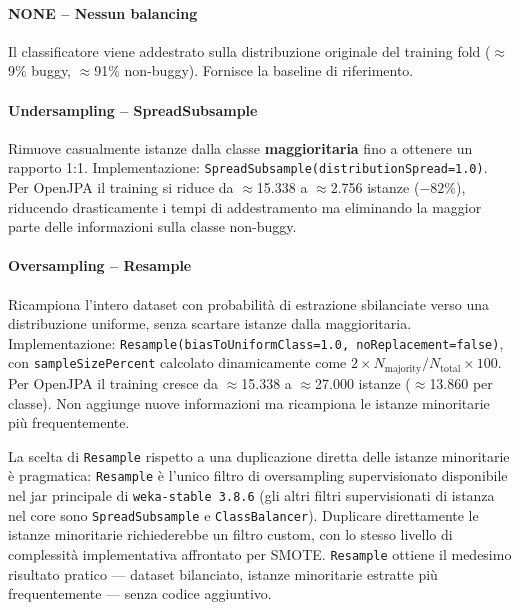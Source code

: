 \paragraph{NONE -- Nessun balancing}

Il classificatore viene addestrato sulla distribuzione originale del training fold
($\approx$9\% buggy, $\approx$91\% non-buggy). Fornisce la baseline di riferimento.

\paragraph{Undersampling -- SpreadSubsample}

Rimuove casualmente istanze dalla classe \textbf{maggioritaria} fino a ottenere un
rapporto 1:1. Implementazione: \texttt{SpreadSubsample(distributionSpread=1.0)}.
Per OpenJPA il training si riduce da $\approx$15.338 a $\approx$2.756 istanze ($-82\%$),
riducendo drasticamente i tempi di addestramento ma eliminando la maggior parte delle
informazioni sulla classe non-buggy.

\paragraph{Oversampling -- Resample}

Ricampiona l'intero dataset con probabilità di estrazione sbilanciate verso una
distribuzione uniforme, senza scartare istanze dalla maggioritaria. Implementazione:
\texttt{Resample(biasToUniformClass=1.0, noReplacement=false)}, con
\texttt{sampleSizePercent} calcolato dinamicamente come
$2 \times N_\text{majority} / N_\text{total} \times 100$. Per OpenJPA il training cresce
da $\approx$15.338 a $\approx$27.000 istanze ($\approx$13.860 per classe). Non aggiunge
nuove informazioni ma ricampiona le istanze minoritarie più frequentemente.

La scelta di \texttt{Resample} rispetto a una duplicazione diretta delle istanze
minoritarie è pragmatica: \texttt{Resample} è l'unico filtro di oversampling supervisionato
disponibile nel jar principale di \texttt{weka-stable 3.8.6} (gli altri filtri supervisionati
di istanza nel core sono \texttt{SpreadSubsample} e \texttt{ClassBalancer}). Duplicare
direttamente le istanze minoritarie richiederebbe un filtro custom, con lo stesso livello
di complessità implementativa affrontato per SMOTE. \texttt{Resample} ottiene il
medesimo risultato pratico --- dataset bilanciato, istanze minoritarie estratte più
frequentemente --- senza codice aggiuntivo.

